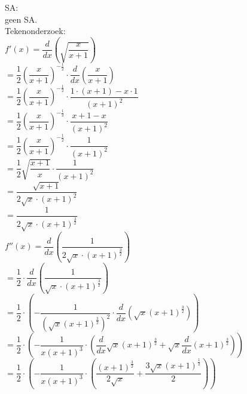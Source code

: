 \documentclass[a4paper]{article}
\begin{document}
SA: \\

geen SA. \\

Tekenonderzoek: \\

$f'(x) = \dfrac{d}{dx}\left(\sqrt{\dfrac{x}{x + 1}}\right)$ \\

$= \dfrac{1}{2} \left(\dfrac{x}{x+1}\right)^{-\tfrac{1}{2}} \cdot \dfrac{d}{dx}\left(\dfrac{x}{x+1}\right)$ \\

$= \dfrac{1}{2} \left(\dfrac{x}{x+1}\right)^{-\tfrac{1}{2}} \cdot  \dfrac{1 \cdot (x+1) - x \cdot 1}{(x+1)^2}$ \\

$= \dfrac{1}{2} \left(\dfrac{x}{x+1}\right)^{-\tfrac{1}{2}} \cdot \dfrac{x + 1 - x}{(x+1)^2}$ \\

$= \dfrac{1}{2} \left(\dfrac{x}{x+1}\right)^{-\tfrac{1}{2}} \cdot \dfrac{1}{(x+1)^2}$ \\

$= \dfrac{1}{2} \sqrt{\dfrac{x+1}{x}} \cdot \dfrac{1}{(x+1)^2}$ \\

$= \dfrac{\sqrt{x+1}}{2\sqrt{x} \cdot (x+1)^2}$ \\

$= \dfrac{1}{2\sqrt{x} \cdot (x+1)^{\tfrac{3}{2}}}$ \\

$f''(x) = \dfrac{d}{dx}\left(\dfrac{1}{2\sqrt{x} \cdot (x + 1)^{\tfrac{3}{2}}}\right)$ \\

$= \dfrac{1}{2} \cdot \dfrac{d}{dx}\left(\dfrac{1}{\sqrt{x} \cdot (x + 1)^{\tfrac{3}{2}}}\right)$ \\

$= \dfrac{1}{2} \cdot \left( -\dfrac{1}{\left(\sqrt{x}(x+1)^{\tfrac{3}{2}}\right)^2} \cdot \dfrac{d}{dx}\left(\sqrt{x}\left(x+1\right)^{\tfrac{3}{2}}\right) \right)$ \\

$= \dfrac{1}{2} \cdot \left( -\dfrac{1}{x(x+1)^3} \cdot \left( \dfrac{d}{dx}\sqrt{x}\left(x+1\right)^{\tfrac{3}{2}} + \sqrt{x}\dfrac{d}{dx}\left(x+1\right)^{\tfrac{3}{2}} \right) \right)$ \\

$= \dfrac{1}{2} \cdot \left( -\dfrac{1}{x(x+1)^3} \cdot \left( \dfrac{(x+1)^{\tfrac{3}{2}}}{2\sqrt{x}} + \dfrac{3\sqrt{x}(x+1)^{\tfrac{1}{2}}}{2} \right) \right)$ \\
\end{document}
